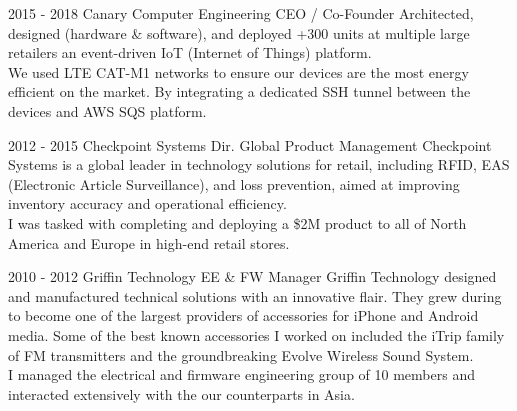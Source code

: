 \vfill\null
\cvevent
{2015 - 2018}
{Canary Computer Engineering}
{CEO / Co-Founder}
{Architected, designed (hardware \& software), and deployed +300 units at multiple large retailers an event-driven IoT (Internet of Things) platform.\\[6pt]
We used LTE CAT-M1 networks to ensure our devices are the most energy efficient on the market. By integrating a dedicated SSH tunnel between the devices and AWS SQS platform.}
{}
{}
{}


\vfill\null
\cvevent
{2012 - 2015}
{Checkpoint Systems}
{Dir. Global Product Management}
{Checkpoint Systems is a global leader in technology solutions for retail, including RFID, EAS (Electronic Article Surveillance), and loss prevention, aimed at improving inventory accuracy and operational efficiency.\\[6pt]I was tasked with completing and deploying a \$2M product to all of North America and Europe in high-end retail stores.}
{}
{}
{}


\vfill\null
\cvevent
{2010 - 2012}
{Griffin Technology}
{EE \& FW Manager}
{
Griffin Technology designed and manufactured technical solutions with an innovative flair. They grew during to become one of the largest providers of accessories for iPhone and Android media. Some of the best known accessories I worked on included the iTrip family of FM transmitters and the groundbreaking Evolve Wireless Sound System.\\[6pt]I managed the electrical and firmware engineering group of 10 members and interacted extensively with the our counterparts in Asia.
}
{}
{}
{}


